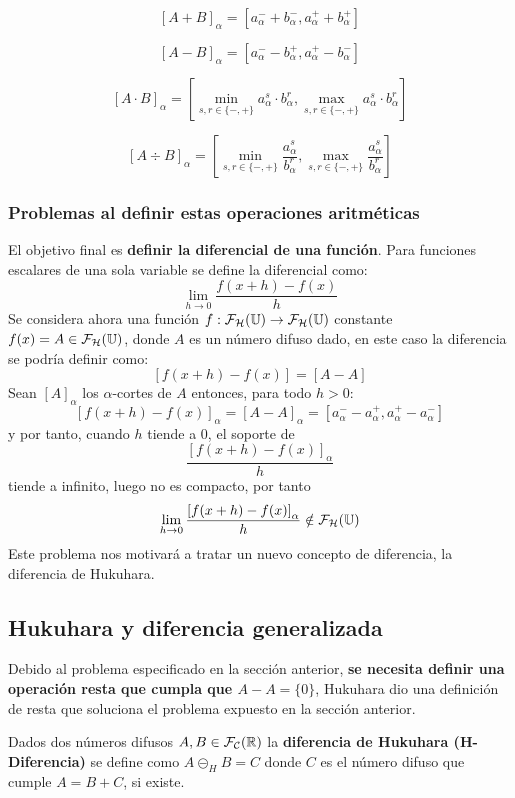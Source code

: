   $$
  [A+B]_\alpha = [a_\alpha^- + b_\alpha^-, a_\alpha^+ + b_\alpha^+]
  $$

  $$
  [A-B]_\alpha = [a_\alpha^- - b_\alpha^+, a_\alpha^+ - b_\alpha^-]
  $$

  $$
  [A \cdot B]_\alpha = \left[ \min_{s, r \in \{-, +\}} a_\alpha^s \cdot b_\alpha^r, \max_{s, r \in \{-, +\}} a_\alpha^s \cdot b_\alpha^r\right]
  $$

  $$
  [A \div B]_\alpha = \left[ \min_{s, r \in \{-, +\}} \frac{a_\alpha^s}{b_\alpha^r}, \max_{s, r \in \{-, +\}} \frac{a_\alpha^s}{b_\alpha^r}\right]
  $$

  \subsubsection{Problemas al definir estas operaciones aritméticas}
  El objetivo final es \textbf{definir la diferencial de una función}. Para funciones escalares de una sola variable se define la diferencial como:
  $$
  \lim\limits_{h\rightarrow 0} \frac{f(x+h) - f(x)}{h}
  $$
  Se considera ahora una función $f : \mathcal{F}_\mathcal{H}(\mathbb U) \rightarrow \mathcal{F}_\mathcal{H}(\mathbb U)$ constante $f(x)=A\in \mathcal{F}_\mathcal{H}(\mathbb U)$, donde $A$ es un número difuso dado, en este caso la diferencia se podría definir como:\\
  $$[f(x+h) - f(x)]=[A-A]$$
  Sean $[A]_\alpha$ los $\alpha$-cortes de $A$ entonces, para todo $h>0$:
  $$
  \left[ f(x+h) - f(x)\right]_\alpha = [A-A]_\alpha = [a_\alpha^- - a_\alpha^+, a_\alpha^+ - a_\alpha^-]
  $$
  y por tanto, cuando $h$ tiende a $0$, el soporte de \[
	  \frac{\left[ f(x+h) - f(x)\right]_\alpha}{h}
  \]
  tiende a infinito, luego no es compacto, por tanto 
  \[
	\lim\limits_{h\rightarrow 0} \frac{\left[ f(x+h) - f(x)\right]_\alpha}{h} \notin \mathcal{F}_\mathcal{H}(\mathbb U)
  \]
  Este problema nos motivará a tratar un nuevo concepto de diferencia, la diferencia de Hukuhara.
  \subsection{Hukuhara y diferencia generalizada} \label{def:hukukara}
  Debido al problema especificado en la sección anterior, \textbf{se necesita definir una operación resta que cumpla que $A-A=\{0\}$}, Hukuhara dio una definición de resta que soluciona el problema expuesto en la sección anterior.

  \begin{definicion}
    Dados dos números difusos $A, B \in \mathcal{F}_\mathcal{C}(\mathbb R)$ la \textbf{diferencia de Hukuhara (H-Diferencia)} se define como $A \circleddash_H B = C$ donde $C$ es el número difuso que cumple $A=B+C$, si existe.
  \end{definicion}

